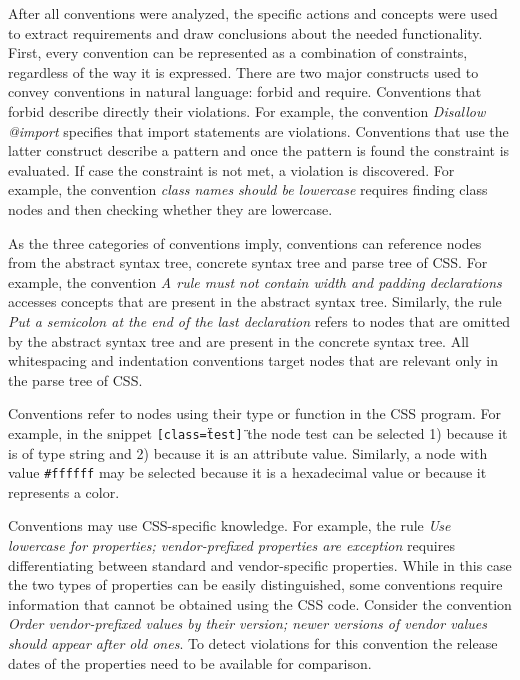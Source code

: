 \documentclass[parskip=full]{uvamscse}
\begin{document}
After all conventions were analyzed, the specific actions and concepts were used to extract
requirements and draw conclusions about the needed functionality. First, every convention can be
represented as a combination of constraints, regardless of the way it is expressed. There are two
major constructs used to convey conventions in natural language: forbid and require. Conventions
that forbid describe directly their violations. For example, the convention \textit{Disallow
@import} specifies that import statements are violations. Conventions that use the latter construct
describe a pattern and once the pattern is found the constraint is evaluated. If case the constraint
is not met, a violation is discovered. For example, the convention \textit{class names should be
lowercase} requires finding class nodes and then checking whether they are lowercase.

As the three categories of conventions imply, conventions can reference nodes from the abstract
syntax tree, concrete syntax tree and parse tree of CSS. For example, the convention \textit{A rule
must not contain width and padding declarations} accesses concepts that are present in the abstract
syntax tree. Similarly, the rule \textit{Put a semicolon at the end of the last declaration} refers
to nodes that are omitted by the abstract syntax tree and are present in the concrete syntax tree.
All whitespacing and indentation conventions target nodes that are relevant only in the parse tree
of CSS.

Conventions refer to nodes using their type or function in the CSS program. For example, in the
snippet \texttt{[class=\"test\"]} the node test can be selected 1) because it is of type string and
2) because it is an attribute value. Similarly, a node with value \texttt{\#ffffff} may be selected
because it is a hexadecimal value or because it represents a color.

Conventions may use CSS-specific knowledge. For example, the rule \textit{Use lowercase for
properties; vendor-prefixed properties are exception} requires differentiating between standard and
vendor-specific properties. While in this case the two types of properties can be easily
distinguished, some conventions require information that cannot be obtained using the CSS code.
Consider the convention \textit{Order vendor-prefixed values by their version; newer versions of
vendor values should appear after old ones}. To detect violations for this convention the release dates of the properties need to be available for comparison.
\end{document}
